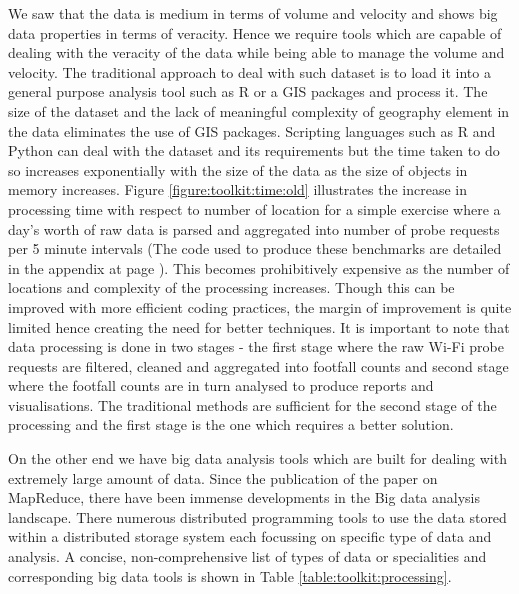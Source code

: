 We saw that the data is medium in terms of volume and velocity and shows big data properties in terms of veracity.
Hence we require tools which are capable of dealing with the veracity of the data while being able to manage the volume and velocity.
The traditional approach to deal with such dataset is to load it into a general purpose analysis tool such as R or a GIS packages and process it.
The size of the dataset and the lack of meaningful complexity of geography element in the data eliminates the use of GIS packages.
Scripting languages such as R and Python can deal with the dataset and its requirements but the time taken to do so increases exponentially with the size of the data as the size of objects in memory increases.
Figure \ref{figure:toolkit:time:old} illustrates the increase in processing time with respect to number of location for a simple exercise where a day's worth of raw data is parsed and aggregated into number of probe requests per 5 minute intervals 
(The code used to produce these benchmarks are detailed in the appendix at page \pageref{appendix:benchmark}).
This becomes prohibitively expensive as the number of locations and complexity of the processing increases.
Though this can be improved with more efficient coding practices, the margin of improvement is quite limited hence creating the need for better techniques.
It is important to note that data processing is done in two stages - the first stage where the raw Wi-Fi probe requests are filtered, cleaned and aggregated into footfall counts and second stage where the footfall counts are in turn analysed to produce reports and visualisations.
The traditional methods are sufficient for the second stage of the processing and the first stage is the one which requires a better solution.

On the other end we have big data analysis tools which are built for dealing with extremely large amount of data.
Since the publication of the paper on MapReduce, there have been immense developments in the Big data analysis landscape.
There numerous distributed programming tools to use the data stored within a distributed storage system each focussing on specific type of data and analysis.
A concise, non-comprehensive list of types of data or specialities and corresponding big data tools is shown in Table \ref{table:toolkit:processing}.

